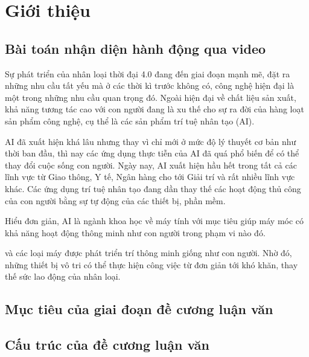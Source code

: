 \section{Giới thiệu}
\subsection{Bài toán nhận diện hành động qua video}
Sự phát triển của nhân loại thời đại 4.0 đang đến giai đoạn mạnh mẽ, đặt
ra những nhu cầu tất yếu mà ở các thời kì trước không có, công nghệ hiện đại
là một trong những nhu cầu quan trọng đó. Ngoài hiện đại về chất liệu sản xuất, khả năng tương tác cao với
con người đang là xu thế cho sự ra đời của hàng loạt sản phẩm công nghệ, cụ thể là các sản phẩm trí tuệ nhân tạo (AI).

AI đã xuất hiện khá lâu nhưng thay vì chỉ mới ở mức độ lý thuyết cơ bản như thời ban đầu, thì nay các ứng dụng
thực tiễn của AI đã quá phổ biến để có thể thay đổi cuộc sống con người. Ngày nay, AI xuất hiện hầu hết trong tất cả các lĩnh
vực từ Giao thông, Y tế, Ngân hàng cho tới Giải trí và rất nhiều lĩnh vực khác. Các ứng dụng trí tuệ nhân tạo đang
dần thay thế các hoạt động thủ công của con người bằng sự tự động của các thiết bị, phần mềm.

Hiểu đơn giản, AI là ngành khoa học về máy tính với mục tiêu giúp máy móc có khả năng hoạt động thông minh như con người trong phạm vi nào đó.

và các loại máy được phát triển trí thông minh giống như con người. Nhờ đó, những thiết bị vô tri có thể thực hiện công việc từ đơn giản tới khó khăn, thay thế sức lao động của nhân loại.




\subsection{Mục tiêu của giai đoạn đề cương luận văn}


\subsection{Cấu trúc của đề cương luận văn}

